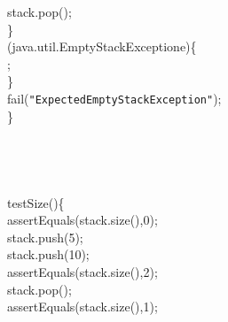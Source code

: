 {{\begin{tabbing}
\makebox[48pt][l]{}\makebox[48pt][l]{}\makebox[48pt][l]{}stack.pop();\\
\makebox[48pt][l]{}\makebox[48pt][l]{}\}\\
\makebox[48pt][l]{}\hspace{6pt}(java.util.EmptyStackException\hspace{6pt}e)\hspace{6pt}\{\\
\makebox[48pt][l]{}\makebox[48pt][l]{};\\
\makebox[48pt][l]{}\makebox[48pt][l]{}\}\\
\makebox[48pt][l]{}\makebox[48pt][l]{}fail({\texttt{\string"Expected\hspace{6pt}EmptyStackException\string"}});\\
\makebox[48pt][l]{}\}\\
\\
\makebox[48pt][l]{}{\it{/$\ast$$\ast$}}\\
\\
\makebox[48pt][l]{}{\it{\hspace{6pt}$\ast$/}}\\
\hspace{6pt}testSize()\hspace{6pt}\{\\
\makebox[48pt][l]{}\makebox[48pt][l]{}assertEquals(stack.size(),\hspace{6pt}0);\\
\makebox[48pt][l]{}\makebox[48pt][l]{}stack.push(5);\\
\makebox[48pt][l]{}\makebox[48pt][l]{}stack.push(10);\\
\makebox[48pt][l]{}\makebox[48pt][l]{}assertEquals(stack.size(),\hspace{6pt}2);\\
\makebox[48pt][l]{}\makebox[48pt][l]{}stack.pop();\\
\makebox[48pt][l]{}\makebox[48pt][l]{}assertEquals(stack.size(),\hspace{6pt}1);\\

\end{tabbing}}}
